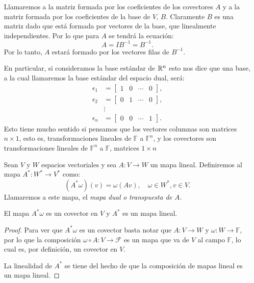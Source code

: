 \begin{example}
	Llamaremos a la matriz formada por los coeficientes de los covectores $A$ y a la matriz formada por los coeficientes de la base de $V$, $B$. Claramente $B$ es una matriz dado que está formada por vectores de la base, que linealmente independientes. Por lo que para $A$ se tendrá la ecuación:
	\[
		A = IB^{-1} = B^{-1}.
	\]
	Por lo tanto, $A$ estará formado por los vectores filas de $B^{-1}$.

	En particular, si consideramos la base estándar de $\mathbb{R}^n$ esto nos dice que una base, a la cual llamaremos la base estándar del espacio dual, será:
	\begin{align*}
		\epsilon_1 & = \begin{bmatrix} 1 & 0 & \cdots & 0\end{bmatrix}, \\
		\epsilon_2 & = \begin{bmatrix} 0 & 1 & \cdots & 0\end{bmatrix}, \\
		           & \vdots                                             \\
		\epsilon_n & = \begin{bmatrix} 0 & 0 & \cdots & 1\end{bmatrix}.
	\end{align*}
	Esto tiene mucho sentido si pensamos que los vectores columnas son matrices $n \times 1$, esto es, transformaciones lineales de $\mathbb{F}$ a $\mathbb{F}^n$, y los covectores son transformaciones lineales de $\mathbb{F}^n$ a $\mathbb{F}$, matrices $1 \times n$
\end{example}

\begin{definition}
	Sean $V$ y $W$ espacios vectoriales y sea $A: V \to W$ un mapa lineal. Definiremos al mapa $A^*: W^* \to V^*$ como:
	\[(A^{*}\omega)(v) = \omega(Av), \quad \omega \in W^{*}, v \in V.\]
	Llamaremos a este mapa, el \it{mapa dual} o \it{transpuesta de $A$}.
\end{definition}

\begin{lemma}
	El mapa $A^{*}\omega$ es un covector en $V$ y $A^{*}$ es un mapa lineal.
\end{lemma}

\begin{proof}
	Para ver que $A^{*}\omega$ es un covector basta notar que $A: V \to W$ y $\omega: W \to \mathbb{F}$, por lo que la composición $\omega \circ A: V \to \mathcal{F}$ es un mapa que va de $V$ al campo $\mathbb{F}$, lo cual es, por definición, un covector en $V$.

	La linealidad de $A^{*}$ se tiene del hecho de que la composición de mapas lineal es un mapa lineal.
\end{proof}

